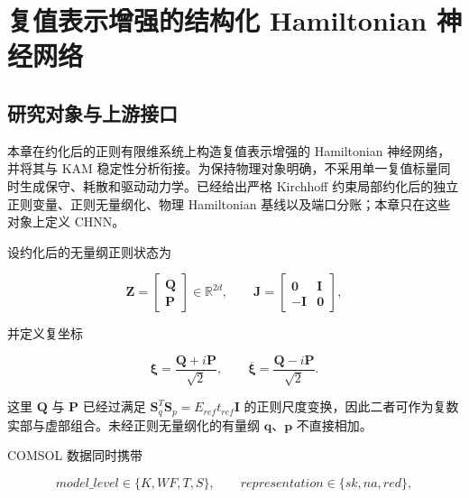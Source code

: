 \section{复值表示增强的结构化 Hamiltonian 神经网络}\label{sec:chnn-model}

\subsection{研究对象与上游接口}\label{sec:chnn-4-1}

本章在约化后的正则有限维系统上构造复值表示增强的 Hamiltonian 神经网络，并将其与 KAM 稳定性分析衔接。为保持物理对象明确，不采用单一复值标量同时生成保守、耗散和驱动动力学。已经给出严格 Kirchhoff 约束局部约化后的独立正则变量、正则无量纲化、物理 Hamiltonian 基线以及端口分账；本章只在这些对象上定义 CHNN。

设约化后的无量纲正则状态为

\begin{equation}
\label{eq:chnn-4-1}
\mathbf{Z} = \begin{bmatrix}
\mathbf{Q} \\
\mathbf{P}
\end{bmatrix} \in \mathbb{R}^{2d},\quad\quad\mathbf{J} = \begin{bmatrix}
\mathbf{0} & \mathbf{I} \\
 - \mathbf{I} & \mathbf{0}
\end{bmatrix},
\end{equation}

并定义复坐标

\begin{equation}
\label{eq:chnn-4-2}
\boxed{\bm{\xi} = \frac{\mathbf{Q} + i\mathbf{P}}{\sqrt{2}},\quad\quad\overline{\bm{\xi}} = \frac{\mathbf{Q} - i\mathbf{P}}{\sqrt{2}}.}
\end{equation}

这里 \(\mathbf{Q}\) 与 \(\mathbf{P}\) 已经过满足 \(\mathbf{S}_{q}^{T}\mathbf{S}_{p} = E_{ref}t_{ref}\mathbf{I}\) 的正则尺度变换，因此二者可作为复数实部与虚部组合。未经正则无量纲化的有量纲 \(\mathbf{q}\)、\(\mathbf{p}\) 不直接相加。

COMSOL 数据同时携带

\begin{equation}
\label{eq:chnn-4-3}
model\_ level \in \{ K,WF,T,S\},\quad\quad representation \in \{ sk,na,red\},
\end{equation}

